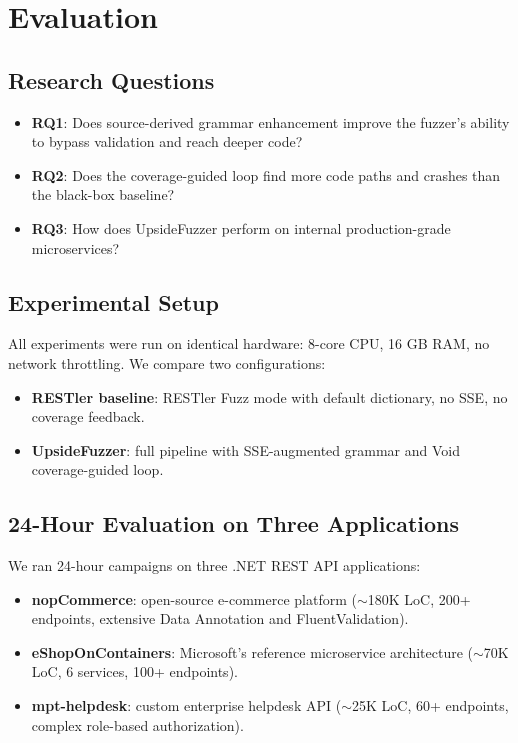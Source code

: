 \documentclass[conference]{IEEEtran}
\begin{document}
\section{Evaluation}
\label{sec:eval}

\subsection{Research Questions}
\begin{itemize}
    \item \textbf{RQ1}: Does source-derived grammar enhancement improve the fuzzer's ability to bypass validation and reach deeper code?
    \item \textbf{RQ2}: Does the coverage-guided loop find more code paths and crashes than the black-box baseline?
    \item \textbf{RQ3}: How does UpsideFuzzer perform on internal production-grade microservices?
\end{itemize}

\subsection{Experimental Setup}

All experiments were run on identical hardware: 8-core CPU, 16 GB RAM, no network throttling. We compare two configurations:
\begin{itemize}
    \item \textbf{RESTler baseline}: RESTler Fuzz mode with default dictionary, no SSE, no coverage feedback.
    \item \textbf{UpsideFuzzer}: full pipeline with SSE-augmented grammar and Void coverage-guided loop.
\end{itemize}

\subsection{24-Hour Evaluation on Three Applications}
\label{sec:eval_24h}

We ran 24-hour campaigns on three .NET REST API applications:
\begin{itemize}
    \item \textbf{nopCommerce}: open-source e-commerce platform ($\sim$180K LoC, 200+ endpoints, extensive Data Annotation and FluentValidation).
    \item \textbf{eShopOnContainers}: Microsoft's reference microservice architecture ($\sim$70K LoC, 6 services, 100+ endpoints).
    \item \textbf{mpt-helpdesk}: custom enterprise helpdesk API ($\sim$25K LoC, 60+ endpoints, complex role-based authorization).
\end{itemize}
\end{document}
